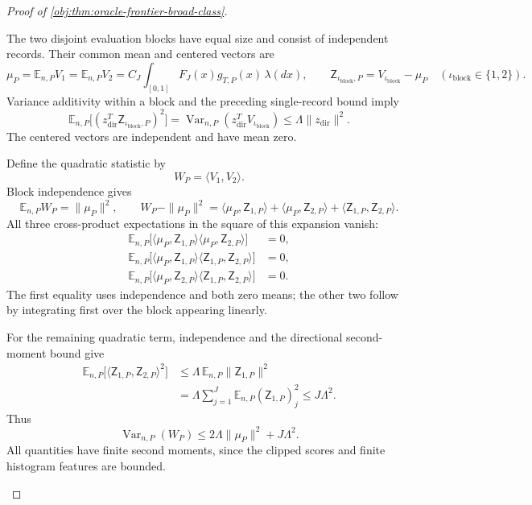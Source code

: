 \documentclass[11pt]{article}
\begin{document}
\begin{proof}[Proof of \cref{obj:thm:oracle-frontier-broad-class}]
\begin{enumerate}
The two disjoint evaluation blocks have equal size and consist of independent records. Their common mean and centered vectors are
\[
\mu_P
=\mathbb E_{n,P}V_1
=\mathbb E_{n,P}V_2
=C_J\int_{[0,1]}F_J(x)g_{T,P}(x)\,\lambda(dx),
\qquad
\mathsf Z_{\iota_{\mathrm{block}},P}=V_{\iota_{\mathrm{block}}}-\mu_P\quad(\iota_{\mathrm{block}}\in\{1,2\}).
\]
Variance additivity within a block and the preceding single-record bound imply
\[
\mathbb E_{n,P}
\bigl[(z_{\mathrm{dir}}^T\mathsf Z_{\iota_{\mathrm{block}},P})^2\bigr]
=
\operatorname{Var}_{n,P}(z_{\mathrm{dir}}^TV_{\iota_{\mathrm{block}}})
\le\Lambda\|z_{\mathrm{dir}}\|^2.
\]
The centered vectors are independent and have mean zero.

Define the quadratic statistic by
\[
W_P=\langle V_1,V_2\rangle.
\]
Block independence gives
\[
\mathbb E_{n,P}W_P=\|\mu_P\|^2,
\qquad
W_P-\|\mu_P\|^2
=
\langle\mu_P,\mathsf Z_{1,P}\rangle
+\langle\mu_P,\mathsf Z_{2,P}\rangle
+\langle\mathsf Z_{1,P},\mathsf Z_{2,P}\rangle.
\]
All three cross-product expectations in the square of this expansion vanish:
\[
\begin{aligned}
\mathbb E_{n,P}
\bigl[\langle\mu_P,\mathsf Z_{1,P}\rangle
      \langle\mu_P,\mathsf Z_{2,P}\rangle\bigr]&=0,\\
\mathbb E_{n,P}
\bigl[\langle\mu_P,\mathsf Z_{1,P}\rangle
      \langle\mathsf Z_{1,P},\mathsf Z_{2,P}\rangle\bigr]&=0,\\
\mathbb E_{n,P}
\bigl[\langle\mu_P,\mathsf Z_{2,P}\rangle
      \langle\mathsf Z_{1,P},\mathsf Z_{2,P}\rangle\bigr]&=0.
\end{aligned}
\]
The first equality uses independence and both zero means; the other two follow by integrating first over the block appearing linearly.

For the remaining quadratic term, independence and the directional second-moment bound give
\[
\begin{aligned}
\mathbb E_{n,P}
\bigl[\langle\mathsf Z_{1,P},\mathsf Z_{2,P}\rangle^2\bigr]
&\le\Lambda\,\mathbb E_{n,P}\|\mathsf Z_{1,P}\|^2\\
&=\Lambda\sum_{j=1}^J
\mathbb E_{n,P}(\mathsf Z_{1,P})_j^2
\le J\Lambda^2.
\end{aligned}
\]
Thus
\[
\operatorname{Var}_{n,P}(W_P)
\le2\Lambda\|\mu_P\|^2+J\Lambda^2.
\]
All quantities have finite second moments, since the clipped scores and finite histogram features are bounded.


\end{enumerate}
\end{proof}
\end{document}
